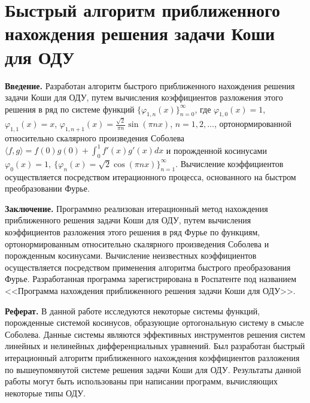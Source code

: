 
\section{Быстрый алгоритм приближенного нахождения решения задачи Коши для ОДУ}



\textbf{ Введение.} Разработан алгоритм быстрого приближенного нахождения решения задачи Коши для ОДУ, путем вычисления коэффициентов разложения этого решения в ряд по системе функций $\{\varphi_{1,n}(x)\}_{n=0}^{\infty}$, где $ \varphi_{1,0}(x)=1$, $\varphi_{1,1}(x)=x$, $\varphi_{1,n+1}(x)=\frac{\sqrt{2}}{\pi n}\sin(\pi nx)$, $n=1,2,\ldots$,
ортонормированной относительно скалярного произведения Соболева $\langle f, g\rangle=f(0)g(0)+\int_0^1f'(x)g'(x)dx$ и порожденной
косинусами $\varphi_0(x)=1,\ \{\varphi_n(x)=\sqrt{2}\cos(\pi nx)\}_{n=1}^\infty$.
Вычисление коэффициентов осуществляется посредством итерационного процесса, основанного на быстром преобразовании Фурье.

\textbf{ Заключение.} Программно реализован итерационный метод нахождения приближенного решения задачи Коши для ОДУ, путем вычисления коэффициентов разложения этого решения в ряд Фурье по функциям, ортонормированным
относительно скалярного произведения Соболева и порожденным косинусами.
Вычисление неизвестных коэффициентов осуществляется посредством применения алгоритма быстрого преобразования Фурье. Разработанная программа зарегистрирована в Роспатенте под названием <<Программа нахождения приближенного решения задачи Коши для ОДУ>>.

\textbf{Реферат.} В данной работе исследуются некоторые системы функций, порожденные системой косинусов, образующие ортогональную систему в смысле Соболева. Данные системы являются эффективных инструментов решения систем линейных и нелинейных 
дифференциальных уравнений.
Был разработан быстрый итерационный алгоритм приближенного нахождения коэффициентов разложения по вышеупомянутой системе
решения задачи Коши для ОДУ. Результаты данной работы могут быть использованы при написании программ, вычисляющих некоторые
типы ОДУ.

